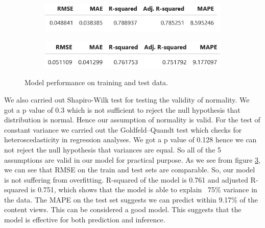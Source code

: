 \documentclass[12pt,a4paper]{style}
\begin{document}
\begin{figure}[h]
	\centering
	\begin{subfigure}[t]{0.45\textwidth}
		\includegraphics[width=\textwidth]{training_performance.png}
		\caption{}
		\label{fig:}
	\end{subfigure}
	\hfill
	\begin{subfigure}[t]{0.45\textwidth}
		\includegraphics[width=\textwidth]{test_performance.png}
		\caption{}
		\label{fig:}
	\end{subfigure}
	\caption{Model performance on training and test data.}
	\label{fig:final model performance}
\end{figure}
We also carried out Shapiro-Wilk test for testing the validity of normality. We got a p value of 0.3 which is not sufficient to reject the null hypothesis that distribution is normal. Hence our assumption of normality is valid. For the test of constant variance we carried out the Goldfeld–Quandt test which checks for heteroscedasticity in regression analyses. We got a p value of 0.128 hence we can not reject the null hypothesis that variances are equal. So all of the 5 assumptions are valid in our model for practical purpose. As we see from figure \ref{fig:final model performance}, we can see that RMSE on the train and test sets are comparable. So, our model is not suffering from overfitting. R-squared of the model is 0.761 and adjusted R-squared is 0.751, which shows that the model is able to explain ~75\% variance in the data. The MAPE on the test set suggests we can predict within 9.17\% of the content views. This can be considered a good model. This suggests that the model is effective for both prediction and inference.  	
\end{document}
